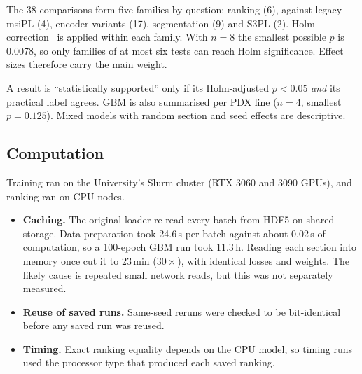 The 38 comparisons form five families by question: ranking (6), against
legacy msiPL (4), encoder variants (17), segmentation (9) and S3PL (2). Holm
correction~\citep{holm1979simple} is applied within each family. With $n=8$
the smallest possible $p$ is 0.0078, so only families of at most six tests can
reach Holm significance. Effect sizes therefore carry the main weight.

A result is ``statistically supported'' only if its Holm-adjusted $p<0.05$
\emph{and} its practical label agrees. GBM is also summarised per PDX line
($n=4$, smallest $p=0.125$). Mixed models with random section and seed effects
are descriptive.

\subsection{Computation}
\label{sec:compute}
Training ran on the University's Slurm cluster (RTX 3060 and 3090 GPUs), and
ranking ran on CPU nodes.
\begin{itemize}
  \item \textbf{Caching.} The original loader re-read every batch from HDF5 on
        shared storage. Data preparation took 24.6\,s per batch against about
        0.02\,s of computation, so a 100-epoch GBM run took 11.3\,h. Reading
        each section into memory once cut it to 23\,min ($30\times$), with
        identical losses and weights. The likely cause is repeated small network
        reads, but this was not separately measured.
  \item \textbf{Reuse of saved runs.} Same-seed reruns were checked to be
        bit-identical before any saved run was reused.
  \item \textbf{Timing.} Exact ranking equality depends on the CPU model, so
        timing runs used the processor type that produced each saved ranking.
\end{itemize}
